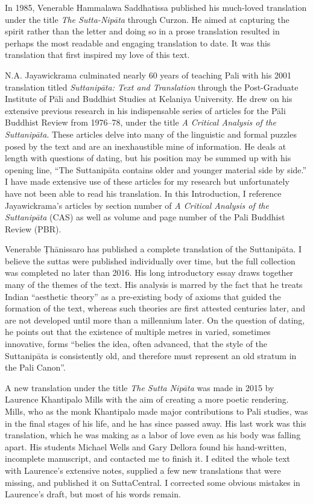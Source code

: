 \documentclass[12pt,openany]{book}%
\begin{document}
In 1985, Venerable Hammalawa Saddhatissa published his much-loved translation under the title \textit{The Sutta-\textsanskrit{Nipāta}} through Curzon. He aimed at capturing the spirit rather than the letter and doing so in a prose translation resulted in perhaps the most readable and engaging translation to date. It was this translation that first inspired my love of this text.

N.A. Jayawickrama culminated nearly 60 years of teaching Pali with his 2001 translation titled \textit{\textsanskrit{Suttanipāta}: Text and Translation} through the Post-Graduate Institute of \textsanskrit{Pāli} and Buddhist Studies at Kelaniya University. He drew on his extensive previous research in his indispensable series of articles for the \textsanskrit{Pāli} Buddhist Review from 1976–78, under the title \textit{A Critical Analysis of the \textsanskrit{Suttanipāta}}. These articles delve into many of the linguistic and formal puzzles posed by the text and are an inexhaustible mine of information. He deals at length with questions of dating, but his position may be summed up with his opening line, “The \textsanskrit{Suttanipāta} contains older and younger material side by side.” I have made extensive use of these articles for my research but unfortunately have not been able to read his translation. In this Introduction, I reference Jayawickrama’s articles by section number of \textit{A Critical Analysis of the \textsanskrit{Suttanipāta}} (CAS) as well as volume and page number of the Pali Buddhist Review (PBR).

Venerable \textsanskrit{Ṭhānissaro} has published a complete translation of the \textsanskrit{Suttanipāta}. I believe the suttas were published individually over time, but the full collection was completed no later than 2016. His long introductory essay draws together many of the themes of the text. His analysis is marred by the fact that he treats Indian “aesthetic theory” as a pre-existing body of axioms that guided the formation of the text, whereas such theories are first attested centuries later, and are not developed until more than a millennium later. On the question of dating, he points out that the existence of multiple metres in varied, sometimes innovative, forms “belies the idea, often advanced, that the style of the \textsanskrit{Suttanipāta} is consistently old, and therefore must represent an old stratum in the Pali Canon”.

A new translation under the title \textit{The Sutta \textsanskrit{Nipāta}} was made in 2015 by Laurence Khantipalo Mills with the aim of creating a more poetic rendering. Mills, who as the monk Khantipalo made major contributions to Pali studies, was in the final stages of his life, and he has since passed away. His last work was this translation, which he was making as a labor of love even as his body was falling apart. His students Michael Wells and Gary Dellora found his hand-written, incomplete manuscript, and contacted me to finish it. I edited the whole text with Laurence’s extensive notes, supplied a few new translations that were missing, and published it on SuttaCentral. I corrected some obvious mistakes in Laurence’s draft, but most of his words remain.
\end{document}
